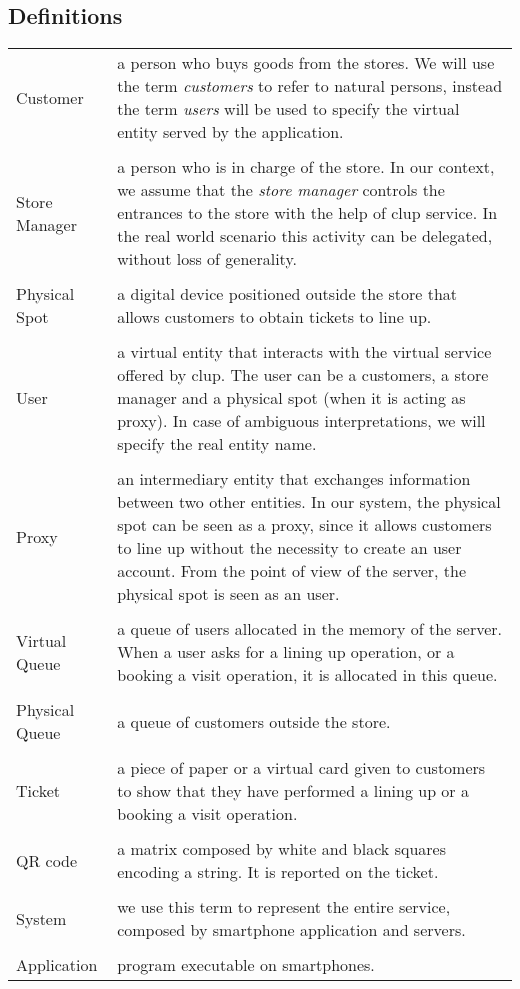 \subsection{Definitions}

\begin{tabularx}{\textwidth}{ >{\hsize=0.2\textwidth}X >{\hsize=0.8\textwidth}X}
  Customer & a person who buys goods from the stores. We will use the term \textit{customers} to refer to natural persons, instead the term \textit{users} will be used to specify the virtual entity served by the application.\\ \\
  Store Manager & a person who is in charge of the store. In our context, we assume that the \textit{store manager} controls the entrances to the store with the help of \gls{clup} service. In the real world scenario this activity can be delegated, without loss of generality.\\ \\
  Physical Spot & a digital device positioned outside the store that allows customers to obtain tickets to line up.\\ \\
  User & a virtual entity that interacts with the virtual service offered by \gls{clup}. The user can be a customers, a store manager and a physical spot (when it is acting as proxy). In case of ambiguous interpretations, we will specify the real entity name.\\ \\
  Proxy & an intermediary entity that exchanges information between two other entities. In our system, the physical spot can be seen as a proxy, since it allows customers to line up without the necessity to create an user account. From the point of view of the server, the physical spot is seen as an user.\\ \\
  Virtual Queue & a queue of users allocated in the memory of the server. When a user asks for a lining up operation, or a booking a visit operation, it is allocated in this queue.\\ \\
  Physical Queue & a queue of customers outside the store.\\ \\
  Ticket & a piece of paper or a virtual card given to customers to show that they have performed a lining up or a booking a visit operation.\\ \\
  QR code & a matrix composed by white and black squares encoding a string. It is reported on the ticket.\\ \\
  System & we use this term to represent the entire service, composed by smartphone application and servers.\\ \\
  Application & program executable on smartphones.
\end{tabularx}


